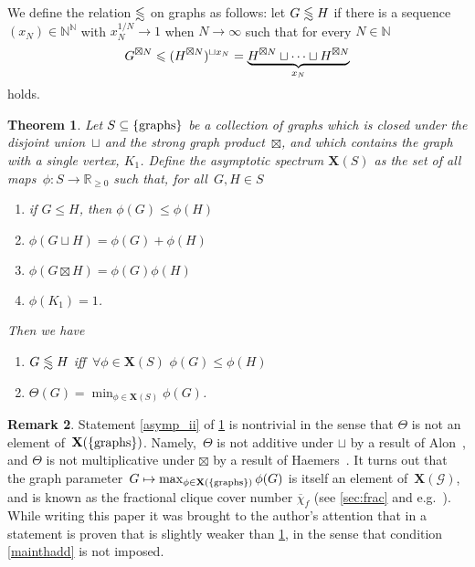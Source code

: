 \documentclass[a4paper, fleqn]{amsart}
\theoremstyle{plain}
\newtheorem{theorem}{Theorem}[section]
\theoremstyle{definition}
\newtheorem{remark}[theorem]{Remark}
\newcommand{\NN}{\mathbb{N}}
\newcommand{\RR}{\mathbb{R}}
\newcommand{\jeroen}[1]{#1}
\let\leqx\leqslant
\newcommand{\asympleqx}{%
  \mathrel{%
    \vphantom{\leqslant}%
    \smash{\vcenter{\doasympleqx}}%
  }%
}
\newcommand{\doasympleqx}{%
  \hbox{\ooalign{%
    \noalign{\kern.25ex}
    $\leqslant$\cr
    \noalign{\kern1.25ex}
    \smash{$\sim$}\cr
  }}%
}
\newcommand{\semiring}[1]{#1}
\newcommand{\graphs}{\mathcal{G}}
\newcommand{\aspec}{\mathbf{X}}
\newcommand{\textgraphs}{\{\textnormal{graphs}\}}
\let\leqx\leqslant
\begin{document}
%

\jeroen{We define the relation $\asympleqx$ on graphs as follows: let $G \asympleqx H$ if there is a sequence~$(x_N) \in \NN^\NN$ with $x_N^{1/N}\to 1$ when $N \to \infty$ such that for every $N\in\NN$
\[
G^{\boxtimes N} \leqx (H^{\boxtimes N})^{\sqcup x_N} = \underbrace{H^{\boxtimes N} \sqcup \cdots \sqcup H^{\boxtimes N}}_{\smash{x_N}}
\]
holds. }


\begin{theorem}\label{basic_th}
Let $\semiring{S}\subseteq \textgraphs$ be a collection of graphs which is closed under the disjoint union~$\sqcup$ and the strong graph product~$\boxtimes$, and which contains the graph with a single vertex, $K_1$.
Define the asymptotic spectrum $\aspec(\semiring{S})$ as the set of all maps~$\phi : \semiring{S} \to \RR_{\geq 0}$ such that, for all~$G,H \in \semiring{S}$
\begin{enumerate}[label=\upshape(\arabic*)]
\item if $G\leqx H$, then $\phi(G) \leq \phi(H)$ \label{mainthmon}
\item $\phi(G \sqcup H) = \phi(G) + \phi(H)$\label{mainthadd}
\item $\phi(G \boxtimes H) = \phi(G)\phi(H)$\label{mainthmult}
\item $\phi(K_1) = 1$.\label{mainthnorm}
\end{enumerate}
Then we have
\begin{enumerate}[label=\upshape(\roman*)]
\item $G \asympleqx H$ iff\, $\forall \phi \in \aspec(\semiring{S})\,\, \phi(G) \leq \phi(H)$\label{asymp_i}
\item $\Theta(G) = \min_{\phi \in \aspec(\semiring{S})} \phi(G)$.\label{asymp_ii}
%
\end{enumerate}
%
%
%
%
%
%
%
%
%
%
%
%
%
%
%
%
%
%
%
%
%
\end{theorem}


%
%

%
%
%
%
%
%
%
%
%
%
%
%

\begin{remark}
Statement \ref{asymp_ii} of \cref{basic_th} is nontrivial in the sense that $\Theta$ is not an element of~$\aspec(\textgraphs)$. Namely,~$\Theta$ is not additive under $\sqcup$ by a result of Alon~\cite{alon1998shannon}, and $\Theta$ is not multiplicative under $\boxtimes$ by a result of Haemers~\cite{haemers1979some}. %
It turns out that the graph parameter~$G \mapsto \max_{\phi \in \aspec(\textgraphs)} \phi(G)$ is 
%
%
itself an element of~$\aspec(\semiring{\graphs})$, and is known as the fractional clique cover number $\overline{\chi}_f$ (see \cref{sec:frac} and e.g.~\cite[Eq.~(67.112)]{schrijver2003combinatorial}).
%
%
%
While writing this paper it was brought to the author's attention that in \jeroen{\cite[Example 8.25]{fritz2017resource}} a statement is proven that is slightly weaker than \cref{basic_th}, in the sense that condition \ref{mainthadd} is not imposed.
\end{remark}
\end{document}
